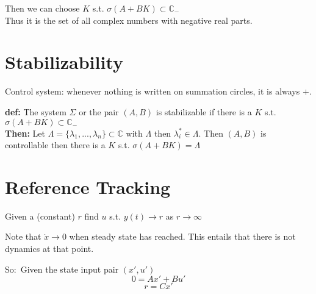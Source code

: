 \documentclass[a4paper]{article}
\begin{document}
Then we can choose $ K $ s.t.  $ \sigma(A + BK ) \subset \mathbb{C}_{-} $\\
Thus it is the set of all complex numbers with negative real parts. 

\section{Stabilizability}

Control system: whenever nothing is written on summation circles, it is always $ + $.

\begin{framed}
	\textbf{def:} The system $ \Sigma $ or the pair  $ (A,B) $ is stabilizable if there is a $ K $ s.t. $ \sigma(A + BK) \subset \mathbb{C}_{-} $ \vspace{10pt}\\ 
	\textbf{Then:} Let $ \Lambda = \{\lambda_1, ... , \lambda_n\} \subset \mathbb{C}$ with $\Lambda$ then $ \lambda_i^{*} \in \Lambda $. Then $ (A,B) $ is controllable then there is a $ K $ s.t.  $ \sigma(A+BK) = \Lambda $
\end{framed}

\section{Reference Tracking}

Given a (constant) $ r $ find  $ u $ s.t. $y(t)  \rightarrow r $ as $ r \rightarrow \infty $

Note that $ \dot{x} \rightarrow 0 $ when steady state has reached. This entails that there is not dynamics at that point.

So:\
Given the state input pair $ (x',u') $ 
\begin{equation}
0 = Ax' + Bu'
\end{equation}
\begin{equation}
r = Cx'
\end{equation}
\end{document}
